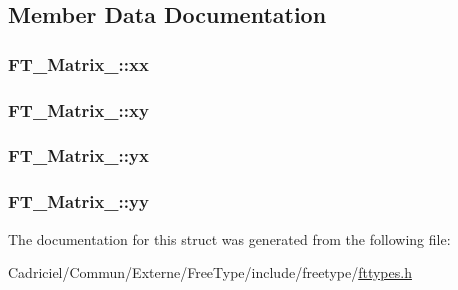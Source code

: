\subsection{Member Data Documentation}
\hypertarget{struct_f_t___matrix___a27d51c2958634abe7bf377610e095f74}{
\subsubsection[{xx}]{ F\-T\-\_\-\-Matrix\-\_\-\-::xx}}\label{struct_f_t___matrix___a27d51c2958634abe7bf377610e095f74}
\hypertarget{struct_f_t___matrix___a7e9f439d37c00ba1a11919bcaa8937a2}{
\subsubsection[{xy}]{ F\-T\-\_\-\-Matrix\-\_\-\-::xy}}\label{struct_f_t___matrix___a7e9f439d37c00ba1a11919bcaa8937a2}
\hypertarget{struct_f_t___matrix___a55792583a843a1611b43c40534a02a17}{
\subsubsection[{yx}]{ F\-T\-\_\-\-Matrix\-\_\-\-::yx}}\label{struct_f_t___matrix___a55792583a843a1611b43c40534a02a17}
\hypertarget{struct_f_t___matrix___a689a6fd20a88238788b90c3597ee0c2a}{
\subsubsection[{yy}]{ F\-T\-\_\-\-Matrix\-\_\-\-::yy}}\label{struct_f_t___matrix___a689a6fd20a88238788b90c3597ee0c2a}


The documentation for this struct was generated from the following file\-:\begin{DoxyCompactItemize}
\item 
Cadriciel/\-Commun/\-Externe/\-Free\-Type/include/freetype/\hyperlink{fttypes_8h}{fttypes.\-h}\end{DoxyCompactItemize}
